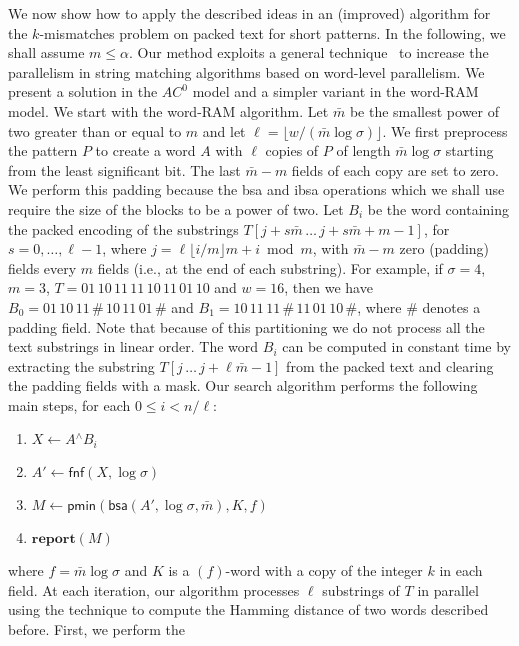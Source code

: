 \documentclass{llncs}
\newcommand{\floor}[1]{\lfloor #1 \rfloor}
\newcommand{\uxor}{\mathrel{^\wedge}}
\newcommand{\fsize}{f}
\newcommand{\word}[1]{#1}
\newcommand{\fword}[1]{$(#1)$-word}
\begin{document}
We now show how to apply the described ideas in an (improved)
algorithm for the $k$-mismatches problem on packed text for short
patterns. In the following, we shall assume $m\le \alpha$. Our method
exploits a general technique~\cite{DBLP:journals/jea/HyyroFN05} to
increase the parallelism in string matching algorithms based on
word-level parallelism. We present a solution in the $AC^0$
model and a simpler variant in the word-RAM model.
We start with the word-RAM algorithm.
Let $\bar{m}$ be the smallest power of two greater than
or equal to $m$ and let $\ell = \floor{w/(\bar{m}\log\sigma)}$. We
first preprocess the pattern $P$ to create a word $\word{A}$ with
$\ell$ copies of $P$ of length $\bar{m}\log\sigma$ starting from the
least significant bit. The last $\bar{m}-m$ fields of each copy are
set to zero. We perform this padding because the \textsf{bsa} and
\textsf{ibsa} operations which we shall use require the size of the
blocks to be a power of two. Let
$\word{B}_i$ be the word containing the packed encoding of the
substrings $T[j+s\bar{m}\,\ldots\,j+s\bar{m}+m-1]$, for
$s=0,\ldots,\ell-1$, where $j = \ell\floor{i/m}m + i\bmod m$, with
$\bar{m}-m$ zero (padding) fields every $m$ fields (i.e., at the end
of each substring). For example, if
$\sigma = 4$, $m=3$, $T=01\,10\,11\,11\,10\,11\,01\,10$ and $w=16$, then we have
$B_0 = 01\,10\,11\,\#\,10\,11\,01\,\#$ and $B_1 =
10\,11\,11\,\#\,11\,01\,10\,\#$, where $\#$ denotes a padding field.
Note that because of this partitioning we do not process all the text
substrings in linear order. The word $B_i$ can be computed in constant
time by extracting the substring $T[j\,\ldots\,j+\ell\bar{m}-1]$ from
the packed text and clearing the padding fields with a mask.
Our search algorithm performs the following main steps, for each $0\le i < n / \ell$:
\begin{enumerate}
\item $\word{X}\leftarrow \word{A} \uxor \word{B}_i$
\item $\word{A'}\leftarrow \textsf{fnf}(\word{X}, \log\sigma)$
\item $M\leftarrow \textsf{pmin}(\textsf{bsa}(\word{A'}, \log\sigma, \bar{m}), K, \fsize)$
\item $\textbf{report}(M)$
\end{enumerate}
where $\fsize = \bar{m}\log\sigma$ and $K$ is a
\fword{\fsize} with a copy of the integer $k$ in each field.
At each iteration, our algorithm processes $\ell$
substrings of $T$ in parallel using the technique to compute the
Hamming distance of two words described before. First, we perform the
\end{document}

